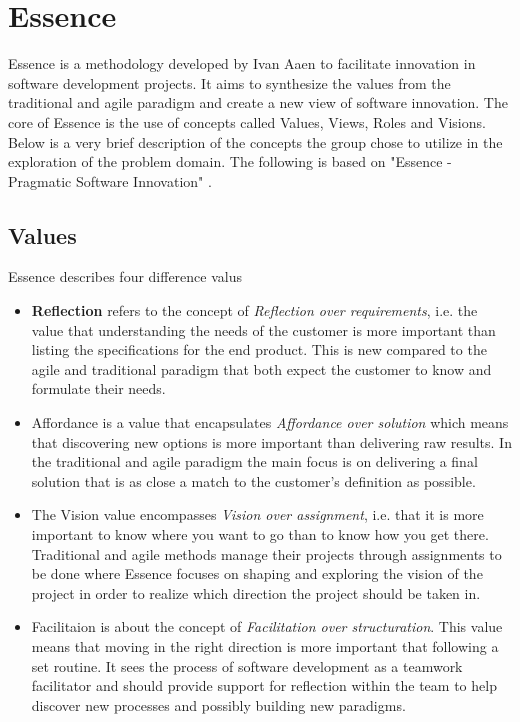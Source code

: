 \section{Essence}
Essence is a methodology developed by Ivan Aaen to facilitate innovation in software development projects. It aims to synthesize the values from the traditional and agile paradigm and create a new view of software innovation. The core of Essence is the use of concepts called Values, Views, Roles and Visions. Below is a very brief description of the concepts the group chose to utilize in the exploration of the problem domain. The following is based on "Essence - Pragmatic Software Innovation" \cite{essence}.

\subsection{Values} 
Essence describes four difference valus 
\begin{itemize}
\item \textbf{Reflection} refers to the concept of \textit{Reflection over requirements}, i.e. the value that understanding the needs of the customer is more important than listing the specifications for the end product. This is new compared to the agile and traditional paradigm that both expect the customer to know and formulate their needs.  
\item Affordance is a value that encapsulates \textit{Affordance over solution} which means that discovering new options is more important than delivering raw results. In the traditional and agile paradigm the main focus is on delivering a final solution that is as close a match to the customer's definition as possible. 
\item The Vision value encompasses \textit{Vision over assignment}, i.e. that it is more important to know where you want to go than to know how you get there. Traditional and agile methods manage their projects through assignments to be done where Essence focuses on shaping and exploring the vision of the project in order to realize which direction the project should be taken in.
\item Facilitaion is about the concept of \textit{Facilitation over structuration}. This value means that moving in the right direction is more important that following a set routine. It sees the process of software development as a teamwork facilitator and should provide support for reflection within the team to help discover new processes and possibly building new paradigms.
\end{itemize}

